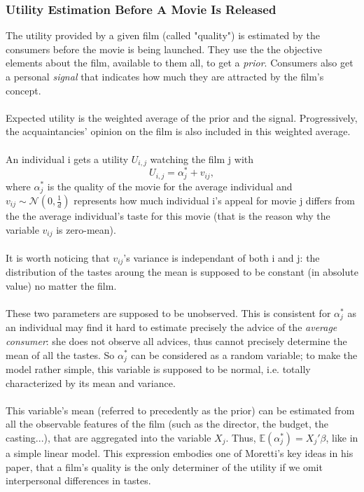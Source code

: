 	\subsubsection{Utility Estimation Before A Movie Is Released}	
	The utility provided by a given film (called "quality") is estimated by the consumers before the movie is being launched. They use the the objective elements about the film, available to them all, to get a \textit{prior}. Consumers also get a personal \textit{signal} that indicates how much they are attracted by the film's concept.\\
	\\
	Expected utility is the weighted average of the prior and the signal. Progressively, the acquaintancies' opinion on the film is also included in this weighted average. \\
	\\
	An individual i gets a utility $U_{i,j}$ watching the film j with\\
	\begin{equation} \label{eq:1}
		U_{i,j}=\alpha_{j}^{*}+v_{i j},
	\end{equation}
	where $\alpha_{j}^{*}$ is the quality of the movie for the average individual and $v_{i j}\sim \mathcal{N}(0,\frac{1}{d})$ represents how much individual i's appeal for movie j differs from the the average individual's taste for this movie (that is the reason why the variable $v_{i j}$ is zero-mean).\\
	\\
	It is worth noticing that $v_{i j}$'s variance is independant of both i and j: the distribution of the tastes aroung the mean is supposed to be constant (in absolute value) no matter the film.\\
	\\
	These two parameters are supposed to be unobserved. This is consistent for $\alpha_{j}^{*}$ as an individual may find it hard to estimate precisely the advice of the \textit{average consumer}: she does not observe all advices, thus cannot precisely determine the mean of all the tastes. So $\alpha_{j}^{*}$ can be considered as a random variable; to make the model rather simple, this variable is supposed to be normal, i.e. totally characterized by its mean and variance.\\
	\\
	This variable's mean (referred to precedently as the prior) can be estimated from all the observable features of the film (such as the director, the budget, the casting...), that are aggregated into the variable $X_{j}$. Thus, $\mathbb{E}(\alpha_{j}^{*})=X_{j}'\beta$, like in a simple linear model. This expression embodies one of Moretti's key ideas in his paper, that a film's quality is the only determiner of the utility if we omit interpersonal differences in tastes.\\
